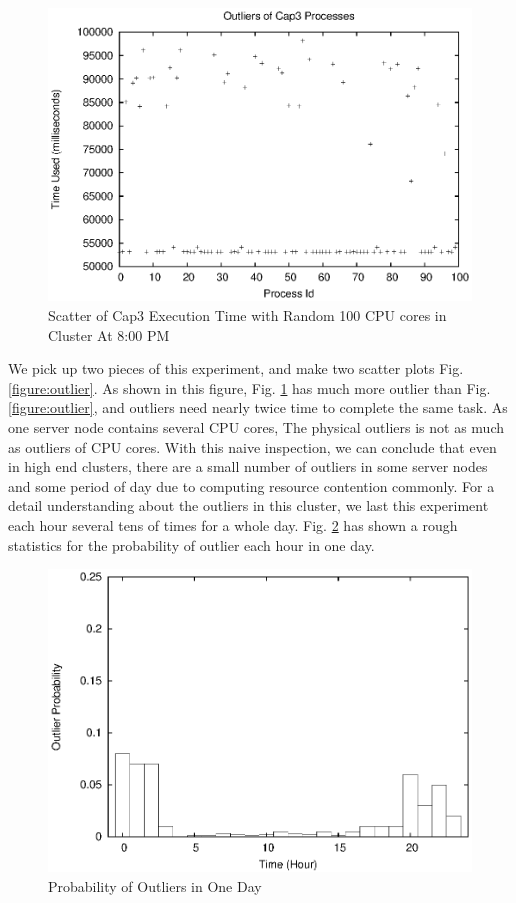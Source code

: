\begin{figure}
\centering
\includegraphics[width=0.9\columnwidth]{figures/yaoutliers.eps}
\caption{Scatter of Cap3 Execution Time with Random 100 CPU cores in Cluster At 8:00 PM}
\label{figure:yaoutlier}
\end{figure}

We pick up two pieces of this experiment, and make two scatter plots Fig. \ref{figure:outlier}. As shown in this figure, Fig.  \ref{figure:yaoutlier} has much more outlier than Fig. \ref{figure:outlier}, and outliers need nearly twice time to complete the same task. As one server node contains several CPU cores, The physical outliers is not as much as outliers of CPU cores. With this naive inspection, we can conclude that even in high end clusters, there are a small number of outliers in some server nodes and some period of day due to computing resource contention commonly. For a detail understanding about the outliers in this cluster, we last this experiment each hour several tens of times for a whole day. Fig. \ref{figure:outlier_stats} has shown a rough statistics for the probability of outlier each hour in one day.

\begin{figure}
\centering
\includegraphics[width=0.9\columnwidth]{figures/outlier_stats.eps}
\caption{Probability of Outliers in One Day}
\label{figure:outlier_stats}
\end{figure}

